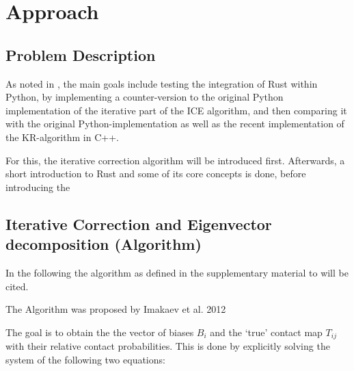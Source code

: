 \chapter{Approach}\label{chap:approach}



\section{Problem Description}\label{sec:problem}



As noted in , the main goals include testing the integration
of Rust within Python, by implementing a counter-version to the original Python
implementation of the iterative part of the ICE algorithm, and then comparing
it with the original Python-implementation as well as the recent implementation
of the KR-algorithm in C++.


For this, the iterative correction algorithm will be introduced first.
Afterwards, a short introduction to Rust and some of its core concepts is done,
before introducing the





\section{Iterative Correction and Eigenvector decomposition (Algorithm)}\label{sec:ICE}

In the following the algorithm as defined in the supplementary material to
\cite{imakaev2012iterative} will be cited.

The Algorithm was proposed by Imakaev et al. 2012 \cite{imakaev2012iterative}

The goal is to obtain the the vector of biases $B_i$ and the `true' contact map
$T_{ij}$ with their relative contact probabilities. This is done by explicitly
solving the system of the following two equations:

